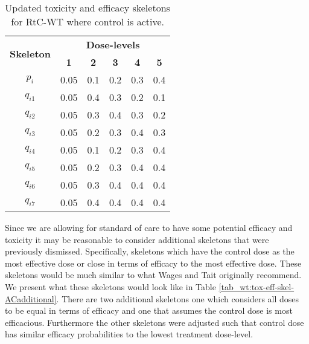   \begin{table}[!h]
 	\centering
 	\caption{Updated toxicity and efficacy skeletons for RtC-WT where control is active.}
 	\label{tab_wt:tox-eff-skel-AC}
 	\begin{tabular}{c|ccccc}
 		\hline
 		\multicolumn{1}{c|}{\multirow{2}{*}{\textbf{Skeleton}}} & \multicolumn{5}{c}{\textbf{Dose-levels}}                       \\
 		\multicolumn{1}{c|}{}                                   & \textbf{1} & \textbf{2} & \textbf{3} & \textbf{4} & \textbf{5} \\ \hline
 		$p_i$    & 0.05 & 0.1 & 0.2 & 0.3 & 0.4 \\
 		$q_{i1}$ & 0.05 & 0.4 & 0.3 & 0.2 & 0.1 \\
 		$q_{i2}$ & 0.05 & 0.3 & 0.4 & 0.3 & 0.2 \\
 		$q_{i3}$ & 0.05 & 0.2 & 0.3 & 0.4 & 0.3 \\
 		$q_{i4}$ & 0.05 & 0.1 & 0.2 & 0.3 & 0.4 \\
 		$q_{i5}$ & 0.05 & 0.2 & 0.3 & 0.4 & 0.4 \\
 		$q_{i6}$ & 0.05 & 0.3 & 0.4 & 0.4 & 0.4 \\
 		$q_{i7}$ & 0.05 & 0.4 & 0.4 & 0.4 & 0.4 \\ \hline
 	\end{tabular}
 \end{table}
 
 Since we are allowing for standard of care to have some potential efficacy and toxicity it may be reasonable to consider additional skeletons that were previously dismissed. Specifically, skeletons which have the control dose as the most effective dose or close in terms of efficacy to the most effective dose. These skeletons would be much similar to what Wages and Tait originally recommend. We present what these skeletons would look like in Table \ref{tab_wt:tox-eff-skel-ACadditional}. There are two additional skeletons one which considers all doses to be equal in terms of efficacy and one that assumes the control dose is most efficacious. Furthermore the other skeletons were adjusted such that control dose has similar efficacy probabilities to the lowest treatment dose-level. 
 
